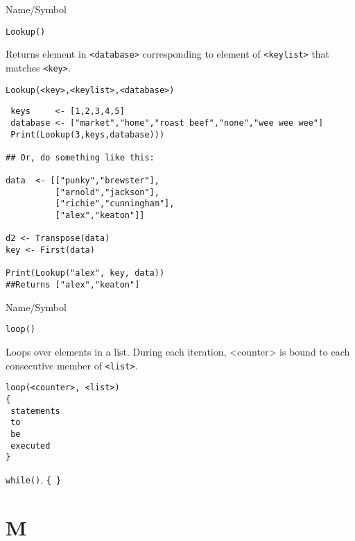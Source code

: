 \begin{desc}{Name/Symbol}
\item[Name/Symbol]	\verb+Lookup()+

\item[Description] Returns
element in \verb+<database>+ corresponding to element of
\verb+<keylist>+ that matches \verb+<key>+.

\item[Usage]		
\begin{verbatim}
Lookup(<key>,<keylist>,<database>)
\end{verbatim}

\item[Example]	

\begin{verbatim}
 keys     <- [1,2,3,4,5]
 database <- ["market","home","roast beef","none","wee wee wee"]
 Print(Lookup(3,keys,database))) 

## Or, do something like this:
  
data  <- [["punky","brewster"],
          ["arnold","jackson"],
          ["richie","cunningham"],
          ["alex","keaton"]]

d2 <- Transpose(data)
key <- First(data)

Print(Lookup("alex", key, data))
##Returns ["alex","keaton"]
\end{verbatim}
\item[See Also]	
\end{desc}

\rl


\begin{desc}{Name/Symbol}
\item[Name/Symbol]	\verb+loop()+

\item[Description]	Loops over elements in a list.  During each iteration, <counter> is bound to each consecutive member of \verb+<list>+.

\item[Usage]		
\begin{verbatim}
loop(<counter>, <list>)
{
 statements
 to
 be	   
 executed
}
\end{verbatim}

\item[Example]	

\item[See Also]	\verb+while()+, \verb+{ }+
\end{desc}

\rl

\section{M}
\rl


